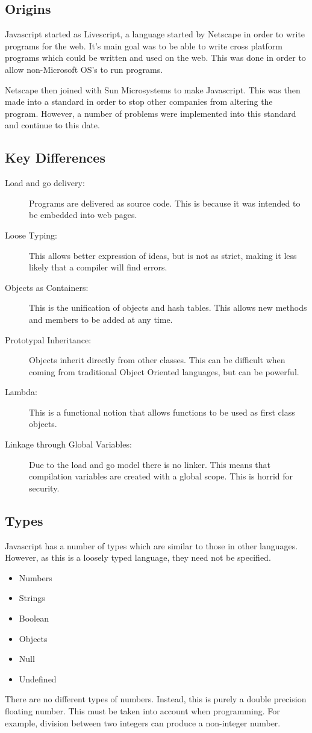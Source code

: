 \documentclass[a4paper,11pt]{report}
\begin{document}
		\subsection{Origins}
			Javascript started as Livescript, a language started by Netscape in order to write programs for the web. 
			It's main goal was to be able to write cross platform programs which could be written and used on the web. 
			This was done in order to allow non-Microsoft OS's to run programs. 

			Netscape then joined with Sun Microsystems to make Javascript. 
			This was then made into a standard in order to stop other companies from altering the program. 
			However, a number of problems were implemented into this standard and continue to this date. 
		\subsection{Key Differences}
			\begin{description}
				\item[Load and go delivery:] Programs are delivered as source code. 
					This is because it was intended to be embedded into web pages. 
				\item[Loose Typing:] This allows better expression of ideas,
					but is not as strict, making it less likely that a compiler will find errors. 
				\item[Objects as Containers:] This is the unification of objects and hash tables.
					This allows new methods and members to be added at any time. 
				\item[Prototypal Inheritance:] Objects inherit directly from other classes. 
					This can be difficult when coming from traditional Object Oriented languages, but can be powerful. 
				\item[Lambda:] This is a functional notion that allows functions to be used as first class objects. 
				\item[Linkage through Global Variables:] Due to the load and go model there is no linker. 
					This means that compilation variables are created with a global scope. 
					This is horrid for security. 
			\end{description}
		\subsection{Types}
			Javascript has a number of types which are similar to those in other languages. 
			However, as this is a loosely typed language, they need not be specified. 
			\begin{itemize}
				\item Numbers
				\item Strings
				\item Boolean
				\item Objects
				\item Null
				\item Undefined
			\end{itemize}
			There are no different types of numbers. 
			Instead, this is purely a double precision floating number. 
			This must be taken into account when programming. 
			For example, division between two integers can produce a non-integer number. 
\end{document}
